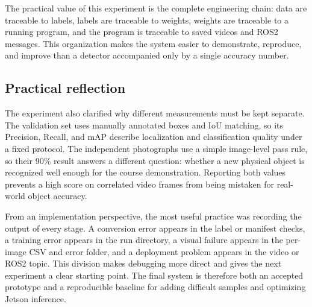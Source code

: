 \documentclass[11pt,conference,a4paper]{IEEEtran}
\begin{document}
The practical value of this experiment is the complete engineering chain: data are traceable to labels, labels are traceable to weights, weights are traceable to a running program, and the program is traceable to saved videos and ROS2 messages. This organization makes the system easier to demonstrate, reproduce, and improve than a detector accompanied only by a single accuracy number.

\subsection*{Practical reflection}
The experiment also clarified why different measurements must be kept separate. The validation set uses manually annotated boxes and IoU matching, so its Precision, Recall, and mAP describe localization and classification quality under a fixed protocol. The independent photographs use a simple image-level pass rule, so their 90\% result answers a different question: whether a new physical object is recognized well enough for the course demonstration. Reporting both values prevents a high score on correlated video frames from being mistaken for real-world object accuracy.

From an implementation perspective, the most useful practice was recording the output of every stage. A conversion error appears in the label or manifest checks, a training error appears in the run directory, a visual failure appears in the per-image CSV and error folder, and a deployment problem appears in the video or ROS2 topic. This division makes debugging more direct and gives the next experiment a clear starting point. The final system is therefore both an accepted prototype and a reproducible baseline for adding difficult samples and optimizing Jetson inference.

\flushend
\end{document}
